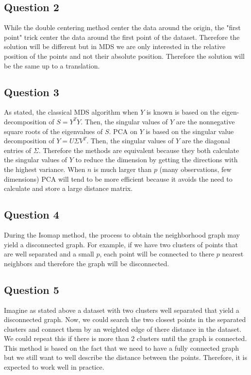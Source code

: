 \documentclass{article}
\begin{document}
\subsection{Question 2}
While the double centering method center the data around the origin, the "first point" trick center the data around the first point of the dataset. Therefore the solution will be different but in MDS we are only interested in the relative position of the points and not their absolute position. Therefore the solution will be the same up to a translation.

\subsection{Question 3}
As stated, the classical MDS algorithm when $Y$ is known is based on the eigen-decomposition of $S = Y^T Y$. Then, the singular values of $Y$ are the nonnegative square roots of the eigenvalues of $S$.
PCA on $Y$ is based on the singular value decomposition of $Y = U \Sigma V^T$. Then, the singular values of $Y$ are the diagonal entries of $\Sigma$. Therefore the methods are equivalent because they both calculate the singular values of $Y$ to reduce the dimension by getting the directions with the highest variance.
When $n$ is much larger than $p$ (many observations, few dimensions) PCA will tend to be more efficient because it avoids the need to calculate and store a large distance matrix.

\subsection{Question 4}
During the Isomap method, the process to obtain the neighborhood graph may yield a disconnected graph. For example, if we have two clusters of points that are well separated and a small $p$, each point will be connected to there $p$ nearest neighbors and therefore the graph will be disconnected.

\subsection{Question 5}
Imagine as stated above a dataset with two clusters well separated that yield a disconnected graph. Now, we could search the two closest points in the separated clusters and connect them by an weighted edge of there distance in the dataset. We could repeat this if there is more than 2 clusters until the graph is connected.
This method is based on the fact that we need to have a fully connected graph but we still want to well describe the distance between the points. Therefore, it is expected to work well in practice.
\end{document}
